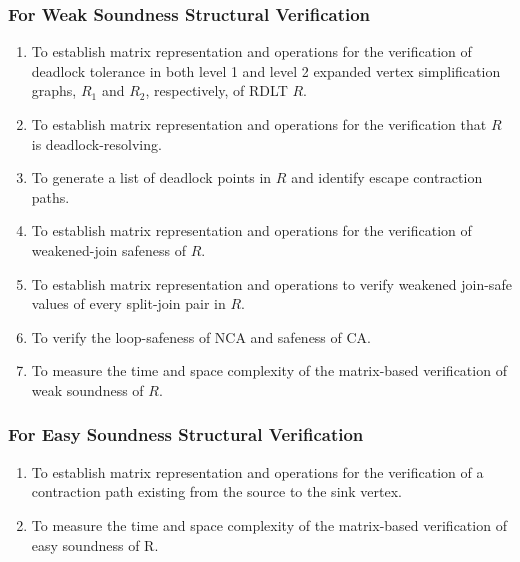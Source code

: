 \subsubsection*{For Weak Soundness Structural Verification}
\begin{enumerate}
    \item To establish matrix representation and operations for the verification of deadlock tolerance in both level 1 and level 2 expanded vertex simplification graphs, $R_1$ and $R_2$, respectively, of RDLT $R$.
    \item To establish matrix representation and operations for the verification that $R$ is deadlock-resolving.
    \item To generate a list of deadlock points in $R$ and identify escape contraction paths.
    \item To establish matrix representation and operations for the verification of weakened-join safeness of $R$.
    \item To establish matrix representation and operations to verify weakened join-safe values of every split-join pair in $R$.
    \item To verify the loop-safeness of NCA and safeness of CA\@.
    \item To measure the time and space complexity of the matrix-based verification of weak soundness of $R$.
\end{enumerate}
\subsubsection*{For Easy Soundness Structural Verification}
\begin{enumerate}
    \item To establish matrix representation and operations for the verification of a contraction path existing from the source to the sink vertex.
    \item To measure the time and space complexity of the matrix-based verification of easy soundness of R.
\end{enumerate}
